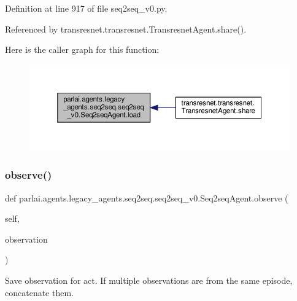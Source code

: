 Definition at line 917 of file seq2seq\+\_\+v0.\+py.



Referenced by transresnet.\+transresnet.\+Transresnet\+Agent.\+share().

Here is the caller graph for this function\+:
\nopagebreak
\begin{figure}[H]
\begin{center}
\leavevmode
\includegraphics[width=350pt]{classparlai_1_1agents_1_1legacy__agents_1_1seq2seq_1_1seq2seq__v0_1_1Seq2seqAgent_a2aabe1e56b7b94f46875ae7f704f681f_icgraph}
\end{center}
\end{figure}
\mbox{\label{classparlai_1_1agents_1_1legacy__agents_1_1seq2seq_1_1seq2seq__v0_1_1Seq2seqAgent_a8419a9652b14a16cedff86206a7bb613}} 
\subsubsection{\texorpdfstring{observe()}{observe()}}
{\footnotesize\ttfamily def parlai.\+agents.\+legacy\+\_\+agents.\+seq2seq.\+seq2seq\+\_\+v0.\+Seq2seq\+Agent.\+observe (\begin{DoxyParamCaption}\item[{}]{self,  }\item[{}]{observation }\end{DoxyParamCaption})}

\begin{DoxyVerb}Save observation for act.
If multiple observations are from the same episode, concatenate them.
\end{DoxyVerb}
 

